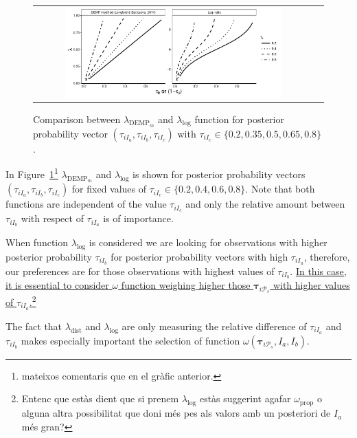 \documentclass[submit]{smj}
\theoremstyle{definition}
\newcommand{\m}[1]{\boldsymbol{#1}}
\begin{document}
\begin{figure}[t]
\begin{center}
\begin{tabular}{cc}
  \includegraphics[width=0.8\textwidth]{figures/demp2_log.pdf} \\
 \end{tabular}
 \caption{Comparison between $\lambda_{\text{DEMP}_m}$ and $\lambda_{\log}$ function for posterior probability 
vector $\left(\tau_{iI_a}, \tau_{iI_b}, \tau_{iI_c} \right)$ with $\tau_{iI_c} \in \{0.2, 0.35, 0.5, 0.65, 0.8\}$.} 
\label{nonsymetric}
\end{center}
\end{figure}

In Figure~\ref{nonsymetric}\footnote{mateixos comentaris que en el gràfic anterior.} $\lambda_{\text{DEMP}_m}$ and $\lambda_{\log}$ is shown for posterior probability vectors $\left(\tau_{iI_a}, \tau_{iI_b}, \tau_{iI_c}\right)$ for fixed values of $\tau_{iI_c} \in \{0.2, 0.4, 0.6, 0.8\}$. Note that both functions are independent of the value $\tau_{iI_c}$ and only the relative amount between $\tau_{iI_b}$ with respect of $\tau_{iI_a}$ is of importance.

When function $\lambda_{\log}$ is considered we are looking for observations with higher posterior probability $\tau_{iI_b}$ for posterior probability vectors with high $\tau_{iI_a}$, therefore, our preferences are for those observations with highest values of $\tau_{iI_b}$. \ul{In this case, it is essential to consider $\omega$ function weighing higher those $\m\tau_{i \mathcal{P}_s}$ with higher values of $\tau_{iI_a}$.}\footnote{Entenc que estàs dient que si prenem $\lambda_{\log}$ estàs suggerint agafar $\omega_{\text{prop}}$ o alguna altra possibilitat que doni més pes als valors amb un posteriori de $I_a$ més gran?}

The fact that $\lambda_{\text{dist}}$ and $\lambda_{\log}$ are only measuring the relative difference of $\tau_{iI_a}$ and $\tau_{iI_b}$ makes especially important the selection of function $\omega(\m\tau_{i \mathcal{P}_s},  I_a,  I_b)$. 
\end{document}
